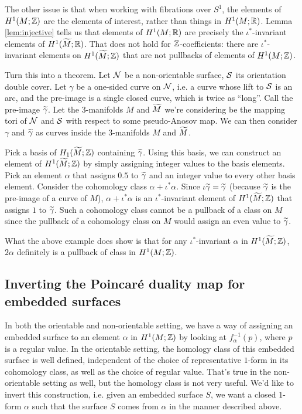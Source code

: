 The other issue is that when working with fibrations over $S^1$, the elements of $H^1(M; \mathbb{Z})$ are
the elements of interest, rather than things in $H^1(M; \mathbb{R})$. Lemma \ref{lem:injective} tells us
that elements of $H^1(M; \mathbb{R})$ are precisely the $\iota^{\ast}$-invariant elements of
$H^1(\widetilde{M}; \mathbb{R})$. That does not hold for $\mathbb{Z}$-coefficients: there are $\iota^{\ast}$-invariant
elements on $H^1(\widetilde{M}; \mathbb{Z})$ that are not pullbacks of elements of $H^1(M; \mathbb{Z})$.
\begin{example}
  {\color{red} Turn this into a theorem.}
  Let $\mathcal{N}$ be a non-orientable surface, $\mathcal{S}$ its orientation double cover. Let $\gamma$ be a
  one-sided curve on $\mathcal{N}$, i.e. a curve whose lift to $\mathcal{S}$ is an arc, and the pre-image is a
  single closed curve, which is twice as ``long''. Call the pre-image $\widetilde{\gamma}$. Let the
  $3$-manifolds $M$ and $\widetilde{M}$ we're considering be the mapping tori of $\mathcal{N}$ and $\mathcal{S}$ with
  respect to some pseudo-Anosov map. We can then consider $\gamma$ and $\widetilde{\gamma}$ as curves
  inside the $3$-manifolds $M$ and $\widetilde{M}$.

  Pick a basis of $H_1(\widetilde{M}; \mathbb{Z})$ containing $\widetilde{\gamma}$. Using this basis, we can construct an element
  of $H^1(\widetilde{M}; \mathbb{Z})$ by simply assigning integer values to the basis elements. Pick an element $\alpha$ that assigns $0.5$ to $\widetilde{\gamma}$ and an
  integer value to every other basis element. Consider the cohomology class $\alpha +
  \iota^{\ast}\alpha$. Since $\iota \widetilde{\gamma} = \widetilde{\gamma}$ (because $\widetilde{\gamma}$ is the pre-image of a
  curve of $M$), $\alpha + \iota^{\ast}\alpha$ is an $\iota^{\ast}$-invariant element of $H^1(\widetilde{M}; \mathbb{Z})$
  that assigns $1$ to $\widetilde{\gamma}$. Such a cohomology class cannot be a pullback of a class on $M$ since the
  pullback of a cohomology class on $M$ would assign an even value to $\widetilde{\gamma}$.
\end{example}

What the above example does show is that for any $\iota^{\ast}$-invariant $\alpha$ in
$H^1(\widetilde{M}; \mathbb{Z})$, $2\alpha$ definitely is a pullback of class in $H^1(M; \mathbb{Z})$.

\subsection{Inverting the Poincar\'e duality map for embedded surfaces}
\label{sec:invert-poincare}

In both the orientable and non-orientable setting, we have a way of assigning an embedded surface
to an element $\alpha$ in $H^1(M; \mathbb{Z})$ by looking at $f_{\alpha}^{-1}(p)$, where $p$ is a regular
value. In the orientable setting, the homology class of this embedded surface is well defined,
independent of the choice of representative $1$-form in its cohomology class, as well as the choice
of regular value. That's true in the non-orientable setting as well, but the homology class is not
very useful. We'd like to invert this construction, i.e. given an embedded surface $S$, we want a
closed $1$-form $\alpha$ such that the surface $S$ comes from $\alpha$ in the manner described
above.

